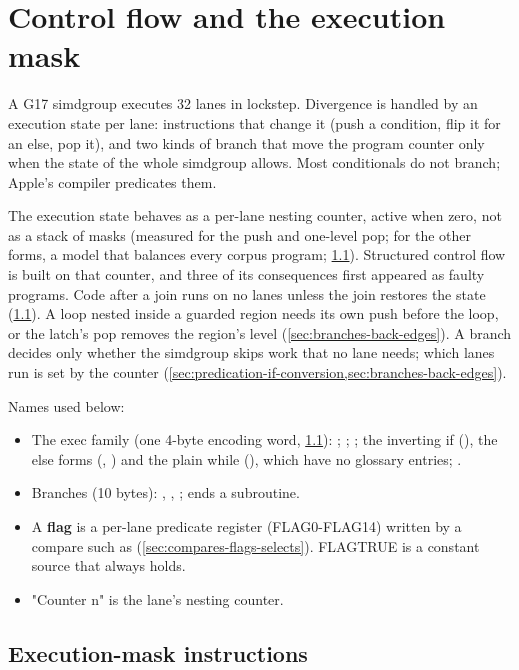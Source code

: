 \chapter{Control flow and the execution mask}\label{ch:control-flow-execution}

A G17 simdgroup executes 32 lanes in lockstep. Divergence is handled by an execution state per lane:
instructions that change it (push a condition, flip it for an else, pop it), and two kinds of branch that move the program
counter only when the state of the whole simdgroup allows. Most conditionals do not branch; Apple's compiler
predicates them.

The execution state behaves as a per-lane nesting counter, active when zero, not as a
stack of masks (measured for the push and one-level pop; for the other forms, a model that balances every corpus program;
\cref{sec:execution-mask-family}). Structured control flow is built on that counter, and three of its consequences
first appeared as faulty programs. Code after a join runs on no lanes unless the join restores the
state (\cref{sec:execution-mask-family}). A loop nested inside a guarded region needs its own push before the loop, or the latch's pop removes the
region's level (\cref{sec:branches-back-edges}). A branch decides only whether the simdgroup skips work that no lane needs; which lanes run is set
by the counter (\cref{sec:predication-if-conversion,sec:branches-back-edges}).

Names used below:

\begin{itemize}
\item The exec family (one 4-byte encoding word, \cref{sec:execution-mask-family}): ; ;
  ; the inverting if (), the else forms (, ) and the plain while
  (), which have no glossary entries; .
\item Branches (10 bytes): , , ;  ends a subroutine.
\item A \textbf{flag} is a per-lane predicate register (FLAG0-FLAG14) written by a compare such as  (\cref{sec:compares-flags-selects}). FLAGTRUE is a constant source that always holds.
\item "Counter n" is the lane's nesting counter.
\end{itemize}

\section{Execution-mask instructions}\label{sec:execution-mask-family}

